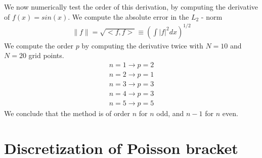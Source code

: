 \documentclass[a4paper,12pt]{scrartcl}
\begin{document}
We now numerically test the order of this derivation, by computing the derivative
of $f(x) = sin(x)$. We compute the absolute error in the $L_2$ - norm 
\begin{align}
    \lVert f\rVert = \sqrt{ <f,f>} \equiv \left( \int |f|^2 dx \right)^{1/2}
    \label{eq:norm}
\end{align}
We compute the order $p$ by computing the derivative twice with $N=10$ and $N=20$ grid
points.
\begin{align*}
    n = 1 \rightarrow p = 2 \\
    n = 2 \rightarrow p = 1 \\
    n = 3 \rightarrow p = 3 \\
    n = 4 \rightarrow p = 3 \\
    n = 5 \rightarrow p = 5
\end{align*}
We conclude that the method is of order $n$ for $n$ odd, and $n-1$ for $n$ even. 







\section{ Discretization of Poisson bracket}
\end{document}
